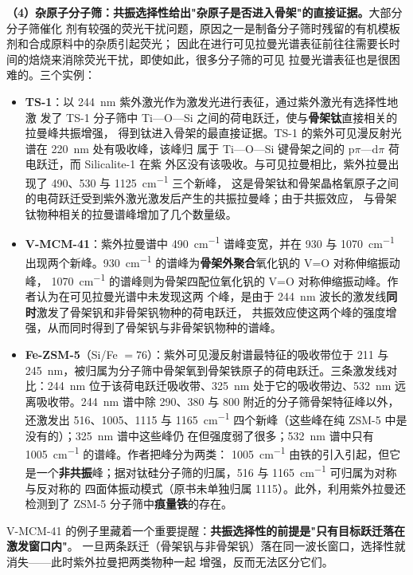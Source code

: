 \textbf{（4）杂原子分子筛：共振选择性给出"杂原子是否进入骨架"的直接证据。}大部分分子筛催化
剂有较强的荧光干扰问题，原因之一是制备分子筛时残留的有机模板剂和合成原料中的杂质引起荧光；
因此在进行可见拉曼光谱表征前往往需要长时间的焙烧来消除荧光干扰，即使如此，很多分子筛的可见
拉曼光谱表征也是很困难的。三个实例：
\begin{itemize}
\item \textbf{TS-1}：以 \qty{244}{nm} 紫外激光作为激发光进行表征，通过紫外激光有选择性地激
  发了 TS-1 分子筛中 Ti—O—Si 之间的荷电跃迁，使与\textbf{骨架钛}直接相关的拉曼峰共振增强，
  得到钛进入骨架的最直接证据。TS-1 的紫外可见漫反射光谱在 \qty{220}{nm} 处有吸收峰，该峰归
  属于 Ti—O—Si 键骨架之间的 $\mathrm{p}\pi$—$\mathrm{d}\pi$ 荷电跃迁，而 Silicalite-1 在紫
  外区没有该吸收。与可见拉曼相比，紫外拉曼出现了 490、530 与 \qty{1125}{cm^{-1}} 三个新峰，
  这是骨架钛和骨架晶格氧原子之间的电荷跃迁受到紫外激光激发后产生的共振拉曼峰；由于共振效应，
  与骨架钛物种相关的拉曼谱峰增加了几个数量级。
\item \textbf{V-MCM-41}：紫外拉曼谱中 \qty{490}{cm^{-1}} 谱峰变宽，并在 930 与
  \qty{1070}{cm^{-1}} 出现两个新峰。\qty{930}{cm^{-1}} 的谱峰为\textbf{骨架外聚合}氧化钒的 V=O 对称伸缩振动峰，
  \qty{1070}{cm^{-1}} 的谱峰则为骨架四配位氧化钒的 V=O 对称伸缩振动峰。作者认为在可见拉曼光谱中未发现这两
  个峰，是由于 \qty{244}{nm} 波长的激发线\textbf{同时}激发了骨架钒和非骨架钒物种的荷电跃迁，
  共振效应使这两个峰的强度增强，从而同时得到了骨架钒与非骨架钒物种的谱峰。
\item \textbf{Fe-ZSM-5}（Si/Fe $=76$）：紫外可见漫反射谱最特征的吸收带位于 211 与
  \qty{245}{nm}，被归属为分子筛中骨架氧到骨架铁原子的荷电跃迁。三条激发线对比：\qty{244}{nm}
  位于该荷电跃迁吸收带、\qty{325}{nm} 处于它的吸收带边、\qty{532}{nm} 远离吸收带。\qty{244}{nm}
  谱中除 290、380 与 $800$ 附近的分子筛骨架特征峰以外，还激发出 516、1005、1115 与
  \qty{1165}{cm^{-1}} 四个新峰（这些峰在纯 ZSM-5 中是没有的）；\qty{325}{nm} 谱中这些峰仍
  在但强度弱了很多；\qty{532}{nm} 谱中只有 \qty{1005}{cm^{-1}} 的谱峰。作者把峰分为两类：
  \qty{1005}{cm^{-1}} 由铁的引入引起，但它是一个\textbf{非共振}峰；据对钛硅分子筛的归属，516 与
  \qty{1165}{cm^{-1}} 可归属为对称与反对称的  四面体振动模式（原书未单独归属 1115）。此外，利用紫外拉曼还检测到了
  ZSM-5 分子筛中\textbf{痕量铁}的存在。
\end{itemize}
V-MCM-41 的例子里藏着一个重要提醒：\textbf{共振选择性的前提是"只有目标跃迁落在激发窗口内"}。
一旦两条跃迁（骨架钒与非骨架钒）落在同一波长窗口，选择性就消失——此时紫外拉曼把两类物种一起
增强，反而无法区分它们。

